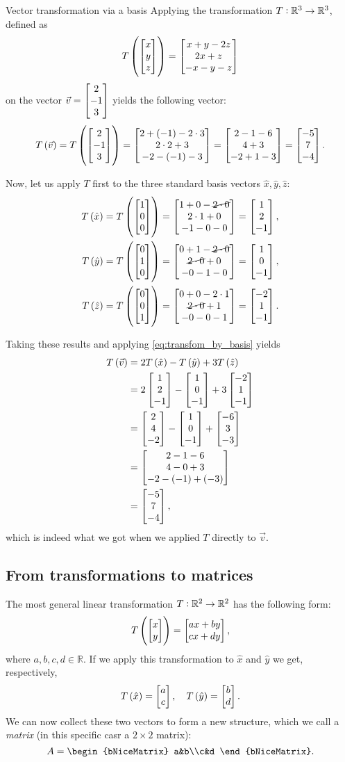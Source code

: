 \begin{example}{Vector transformation via a basis}{}
	Applying the transformation $T:\mathbb{R}^{3}\to\mathbb{R}^{3}$, defined as
	\[
		T\left(\colvec{x;y;z}\right)=\colvec{x+y-2z;2x+z;-x-y-z}
	\]
	on the vector $\vec{v}=\colvec{2;-1;3}$ yields the following vector:
	\[
		T\left(\vec{v}\right) = T\left(\colvec{2;-1;3}\right) = \colvec{2+(-1)-2\cdot3;2\cdot2+3;-2-(-1)-3} = \colvec{2-1-6;4+3;-2+1-3} = \colvec{-5;7;-4}.
	\]

	Now, let us apply $T$ first to the three standard basis vectors $\hat{x},\hat{y},\hat{z}$:
	\begin{align*}
		T\left( \hat{x} \right) &= T\left(\colvec{1;0;0}\right) = \colvec{1+0-\cancel{2\cdot0};2\cdot1+0;-1-0-0} = \colvec{1;2;-1},\\
		T\left( \hat{y} \right) &= T\left(\colvec{0;1;0}\right) = \colvec{0+1-\cancel{2\cdot0};\cancel{2\cdot0}+0;-0-1-0} = \colvec{1;0;-1},\\
		T\left( \hat{z} \right) &= T\left(\colvec{0;0;1}\right) = \colvec{0+0-2\cdot1;\cancel{2\cdot0}+1;-0-0-1} = \colvec{-2;1;-1}.
	\end{align*}

	Taking these results and applying \autoref{eq:transfom_by_basis} yields
	\begin{align*}
		T\left( \vec{v} \right) &= 2T \left( \hat{x} \right) -T \left( \hat{y} \right) + 3T \left( \hat{z} \right)\\
								&= 2\colvec{1;2;-1} - \colvec{1;0;-1} + 3\colvec{-2;1;-1}\\
								&= \colvec{2;4;-2} - \colvec{1;0;-1} + \colvec{-6;3;-3}\\
								&= \colvec{2-1-6;4-0+3;-2-(-1)+(-3)}\\
								&= \colvec{-5;7;-4},
	\end{align*}
	which is indeed what we got when we applied $T$ directly to $\vec{v}$.
\end{example}

\subsection{From transformations to matrices}
The most general linear transformation $T:\mathbb{R}^{2}\to\mathbb{R}^{2}$ has the following form:
\begin{equation}
	T \left( \colvec{x;y} \right) = \colvec{ax+by;cx+dy},
	\label{eq:generic_R2_LT}
\end{equation}
where $a,b,c,d\in\mathbb{R}$. If we apply this transformation to $\hat{x}$ and $\hat{y}$ we get, respectively,
\begin{equation}
	T \left( \hat{x} \right) = \colvec{a;c},\quad T \left( \hat{y} \right) = \colvec{b;d}.
	\label{eq:}
\end{equation}
We can now collect these two vectors to form a new structure, which we call a \emph{matrix} (in this specific casr a $2\times2$ matrix):
\begin{equation}
	A = \begin{bNiceMatrix} a&b\\c&d \end{bNiceMatrix}.
	\label{eq:matrix}
\end{equation}


